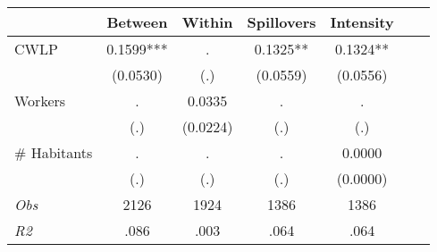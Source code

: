 \begin{tabular}{l*{6}{c}}\hline&\multicolumn{1}{c}{Between}&\multicolumn{1}{c}{Within}&\multicolumn{1}{c}{Spillovers}&\multicolumn{1}{c}{Intensity}\\ \hline 
CWLP & 0.1599*** & . & 0.1325** & 0.1324** \\
 & (0.0530) & (.) & (0.0559) & (0.0556) \\
Workers & . & 0.0335 & . & . \\
 & (.) & (0.0224) & (.) & (.) \\
\# Habitants & . & . & . & 0.0000 \\
  & (.) & (.) & (.) & (0.0000) \\
\hline \textit{Obs} & 2126 & 1924 & 1386 & 1386  \\ \textit{R2} & .086 & .003 & .064 & .064 \\ \hline \end{tabular}

